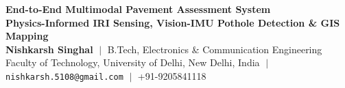 \documentclass[9pt,a4paper]{extarticle}
\begin{document}
\noindent
\begin{minipage}{0.71\textwidth}
    {\LARGE \textbf{\color{crriblue}End-to-End Multimodal Pavement Assessment System}}\\[3pt]
    {\large \textbf{Physics-Informed IRI Sensing, Vision-IMU Pothole Detection \& GIS Mapping}}\\[2pt]
    {\small \textbf{Nishkarsh Singhal} $\;\vert\;$ B.Tech, Electronics \& Communication Engineering}\\[1pt]
    {\small Faculty of Technology, University of Delhi, New Delhi, India $\;\vert\;$ \texttt{nishkarsh.5108@gmail.com} $\;\vert\;$ +91-9205841118}
\end{minipage}%
\hfill
\begin{minipage}{0.27\textwidth}
    \raggedleft
\end{minipage}

\vspace{3pt}

\end{document}
